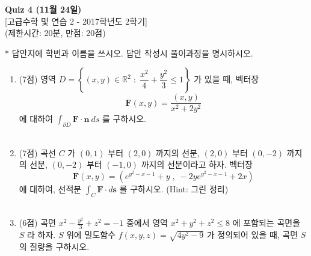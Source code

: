 \documentclass[12pt]{article}
\begin{document}
\begin{center}
\textbf{Quiz 4 (11월 24일)}\\
{[고급수학 및 연습 2 - 2017학년도 2학기]}\\
(제한시간: 20분, 만점: 20점)\\
\end{center}

* 답안지에 학번과 이름을 쓰시오. 답안 작성시 풀이과정을 명시하시오.\\

\begin{enumerate}
\item (7점) 영역 $D = \left\{ (x, y) \in \mathbb{R}^2 \; : \; \dfrac{x^2}{4}+\dfrac{y^2}{3}\leq 1 \right\}$ 가 있을 때, 벡터장
$$\mathrm{\mathbf{F}}(x, y) = \frac{(x, y)}{x^2+2y^2}$$ 에 대하여 $\displaystyle \int_{\partial D} \mathrm{\mathbf{F}} \cdot \mathrm{\mathbf{n}}\: ds$ 를 구하시오.
~\\\\
\item (7점) 곡선 $C$ 가 $(0, 1)$ 부터 $(2, 0)$ 까지의 선분, $(2, 0)$ 부터 $(0, -2)$ 까지의 선분, $(0, -2)$ 부터 $(-1, 0)$ 까지의 선분이라고 하자. 벡터장
$$\mathrm{\mathbf{F}}(x, y) = \left(e^{y^2-x-1} + y\;,\; -2ye^{y^2-x-1} + 2x\right)$$ 에 대하여, 선적분 $\displaystyle \int_C \mathrm{\mathbf{F}}\cdot d\mathrm{\mathbf{s}}$ 를 구하시오. (Hint: 그린 정리)
~\\\\
\item (6점) 곡면 $\displaystyle x^2-\frac{y^2}{3}+z^2=-1$ 중에서 영역 $x^2+y^2+z^2\leq 8$ 에 포함되는 곡면을 $S$ 라 하자. $S$ 위에 밀도함수 $f(x, y, z)=\sqrt{4y^2-9}$ 가 정의되어 있을 때, 곡면 $S$ 의 질량을 구하시오.


\end{enumerate}
\end{document}

